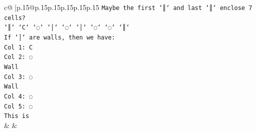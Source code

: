\documentclass{article}
\begin{document}
{\begin{supertabular}{c@{$\;$}|p{.15\linewidth}@{}p{.15\linewidth}p{.15\linewidth}p{.15\linewidth}p{.15\linewidth}p{.15\linewidth}}
{{{\texttt{Maybe the first `║` and last `║` enclose 7 cells?} \\
\texttt{`║` `C` `◌` `│` `◌` `│` `◌` `◌` `║`} \\
\texttt{If `│` are walls, then we have:} \\
\texttt{Col 1: C} \\
\texttt{Col 2: ◌} \\
\texttt{Wall} \\
\texttt{Col 3: ◌} \\
\texttt{Wall} \\
\texttt{Col 4: ◌} \\
\texttt{Col 5: ◌} \\
\texttt{This is} \\
            }
        }
    }
    & & \\ \\


\end{supertabular}}
\end{document}
